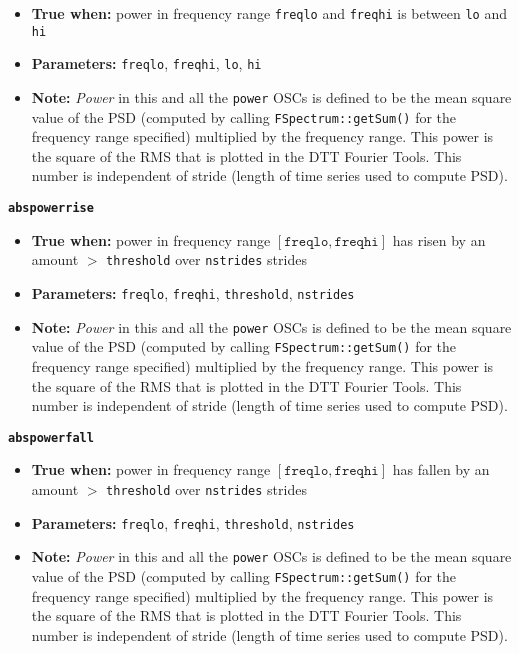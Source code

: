 \documentclass[11pt]{article}
\begin{document}
\begin{itemize}
\item \textbf{True when:} power in frequency range \texttt{freqlo}
  and \texttt{freqhi} is between \texttt{lo} and \texttt{hi}
\item \textbf{Parameters:} \texttt{freqlo}, \texttt{freqhi},
  \texttt{lo}, \texttt{hi}
\item \textbf{Note:} \textit{Power} in this and all the \texttt{power}
  OSCs is defined to be the mean square value of the PSD
 (computed by calling \texttt{FSpectrum::getSum()} for the
  frequency range specified) multiplied by the frequency range.  This
  power is the square of the RMS that is plotted in the DTT Fourier
  Tools. This number is independent of stride (length of time series
  used to compute PSD). 
\end{itemize}

{\large\texttt{\textbf{abspowerrise}}}
\begin{itemize}
\item \textbf{True when:} power in frequency range
  $[\mathtt{freqlo}, \mathtt{freqhi}]$ has risen by an amount
  $>$ \texttt{threshold} over \texttt{nstrides} strides
\item \textbf{Parameters:} \texttt{freqlo}, \texttt{freqhi},
  \texttt{threshold}, \texttt{nstrides}
\item \textbf{Note:} \textit{Power} in this and all the \texttt{power}
  OSCs is defined to be the mean square value of the PSD
  (computed by calling \texttt{FSpectrum::getSum()} for the
  frequency range specified) multiplied by the frequency range.  This
  power is the square of the RMS that is plotted in the DTT Fourier
  Tools.  This number is independent of stride (length of time series
  used to compute PSD). 
\end{itemize}

{\large\texttt{\textbf{abspowerfall}}}
\begin{itemize}
\item \textbf{True when:} power in frequency range
  $[\mathtt{freqlo}, \mathtt{freqhi}]$ has fallen by an amount
  $>$ \texttt{threshold} over \texttt{nstrides} strides
\item \textbf{Parameters:} \texttt{freqlo}, \texttt{freqhi},
  \texttt{threshold}, \texttt{nstrides}  
\item \textbf{Note:} \textit{Power} in this and all the \texttt{power}
  OSCs is defined to be the mean square value of the PSD
  (computed by calling \texttt{FSpectrum::getSum()} for the
  frequency range specified) multiplied by the frequency range.  This
  power is the square of the RMS that is plotted in the DTT Fourier
  Tools. This number is independent of stride (length of time series
  used to compute PSD). 
\end{itemize}
\end{document}
